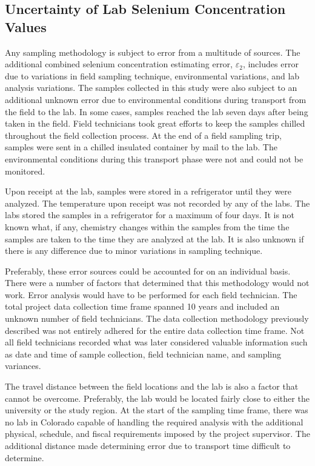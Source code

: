 \begin{linenumbers}
\subsection{Uncertainty of Lab Selenium Concentration Values}
Any sampling methodology is subject to error from a multitude of sources.  The additional combined selenium concentration estimating error, $\varepsilon_{2}$, includes error due to variations in field sampling technique, environmental variations, and lab analysis variations.  The samples collected in this study were also subject to an additional unknown error due to environmental conditions during transport from the field to the lab.  In some cases, samples reached the lab seven days after being taken in the field.  Field technicians took great efforts to keep the samples chilled throughout the field collection process.  At the end of a field sampling trip, samples were sent in a chilled insulated container by mail to the lab.  The environmental conditions during this transport phase were not and could not be monitored.

Upon receipt at the lab, samples were stored in a refrigerator until they were analyzed.  The temperature upon receipt was not recorded by any of the labs.  The labs stored the samples in a refrigerator for a maximum of four days.  It is not known what, if any, chemistry changes within the samples from the time the samples are taken to the time they are analyzed at the lab.  It is also unknown if there is any difference due to minor variations in sampling technique.

Preferably, these error sources could be accounted for on an individual basis.  There were a number of factors that determined that this methodology would not work.  Error analysis would have to be performed for each field technician.  The total project data collection time frame spanned 10 years and included an unknown number of field technicians.  The data collection methodology previously described was not entirely adhered for the entire data collection time frame.  Not all field technicians recorded what was later considered valuable information such as date and time of sample collection, field technician name, and sampling variances.

The travel distance between the field locations and the lab is also a factor that cannot be overcome.  Preferably, the lab would be located fairly close to either the university or the study region.  At the start of the sampling time frame, there was no lab in Colorado capable of handling the required analysis with the additional physical, schedule, and fiscal requirements imposed by the project supervisor.  The additional distance made determining error due to transport time difficult to determine.


\end{linenumbers}
